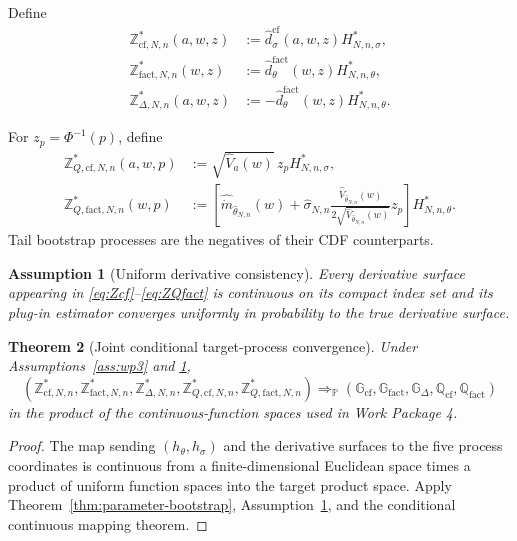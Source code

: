 \documentclass[11pt]{article}
\newtheorem{assumption}{Assumption}[section]
\newtheorem{theorem}[assumption]{Theorem}
\theoremstyle{remark}
\newcommand{\Pp}{\mathbb P}
\newcommand{\cf}{\mathrm{cf}}
\newcommand{\fact}{\mathrm{fact}}
\newcommand{\thetahat}{\widehat\theta_{N,n}}
\newcommand{\sigmahat}{\widehat\sigma_{N,n}}
\newcommand{\Ph}{\Phi}
\begin{document}
Define
\begin{align}
 \mathbb Z_{\cf,N,n}^*(a,w,z)
 &:=
 \widehat d_\sigma^{\cf}(a,w,z)
 H_{N,n,\sigma}^*,\label{eq:Zcf}\\
 \mathbb Z_{\fact,N,n}^*(w,z)
 &:=
 \widehat d_\theta^{\fact}(w,z)
 H_{N,n,\theta}^*,\label{eq:Zfact}\\
 \mathbb Z_{\Delta,N,n}^*(a,w,z)
 &:=
 -\widehat d_\theta^{\fact}(w,z)
 H_{N,n,\theta}^*.\label{eq:ZDelta}
\end{align}

For $z_p=\Ph^{-1}(p)$, define
\begin{align}
 \mathbb Z_{Q,\cf,N,n}^*(a,w,p)
 &:=
 \sqrt{\widehat V_a(w)}\,z_p H_{N,n,\sigma}^*,\label{eq:ZQcf}\\
 \mathbb Z_{Q,\fact,N,n}^*(w,p)
 &:=
 \left[
 \widehat{\dot m}_{\thetahat}(w)
 +\sigmahat
 \frac{\widehat{\dot V}_{\thetahat}(w)}
 {2\sqrt{\widehat V_{\thetahat}(w)}}z_p
 \right]H_{N,n,\theta}^*.\label{eq:ZQfact}
\end{align}
Tail bootstrap processes are the negatives of their CDF counterparts.

\begin{assumption}[Uniform derivative consistency]\label{ass:derivative}
Every derivative surface appearing in \eqref{eq:Zcf}--\eqref{eq:ZQfact} is continuous on its compact index set and its plug-in estimator converges uniformly in probability to the true derivative surface.
\end{assumption}

\begin{theorem}[Joint conditional target-process convergence]\label{thm:process-bootstrap}
Under Assumptions~\ref{ass:wp3} and \ref{ass:derivative},
\[
 \left(
 \mathbb Z_{\cf,N,n}^*,
 \mathbb Z_{\fact,N,n}^*,
 \mathbb Z_{\Delta,N,n}^*,
 \mathbb Z_{Q,\cf,N,n}^*,
 \mathbb Z_{Q,\fact,N,n}^*
 \right)
 \Rightarrow_{\Pp}
 \left(
 \mathbb G_{\cf},
 \mathbb G_{\fact},
 \mathbb G_\Delta,
 \mathbb Q_{\cf},
 \mathbb Q_{\fact}
 \right)
\]
in the product of the continuous-function spaces used in Work Package 4.
\end{theorem}

\begin{proof}
The map sending $(h_\theta,h_\sigma)$ and the derivative surfaces to the five process coordinates is continuous from a finite-dimensional Euclidean space times a product of uniform function spaces into the target product space. Apply Theorem~\ref{thm:parameter-bootstrap}, Assumption~\ref{ass:derivative}, and the conditional continuous mapping theorem.
\end{proof}
\end{document}
